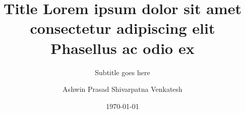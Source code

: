 \title{Title Lorem ipsum dolor sit amet consectetur adipiscing elit Phasellus ac odio ex} 

\subtitle{Subtitle goes here}

\author{Ashwin Prasad Shivarpatna Venkatesh}


\date{\today} 

\newcommand{\upbcolor}{uni-cyan} 

